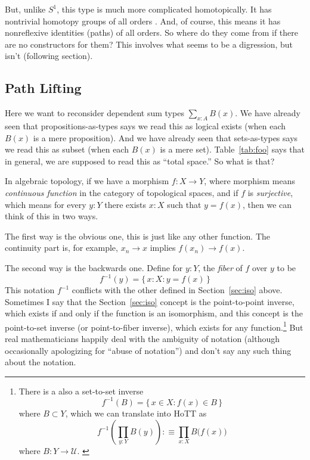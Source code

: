 \documentclass[11pt]{article}
\newcommand{\set}[1]{\{\,#1\,\}}
\newcommand{\universe}{\mathcal{U}}
\begin{document}
But, unlike $S^1$, this type is much more complicated homotopically.
It has nontrivial homotopy groups of all orders
.
And, of course, this means it has nonreflexive identities (paths) of all
orders.  So where do they come from if there are no constructors for them?
This involves what seems to be a digression, but isn't (following section).

\subsection{Path Lifting}
\label{sec:lifting}

Here we want to reconsider dependent sum types $\sum_{x : A} B(x)$.
We have already seen that propositions-as-types says we read this as
logical exists (when each $B(x)$ is a mere proposition).
And we have already seen that sets-as-types says we read this as
subset (when each $B(x)$ is a mere set).
Table~\ref{tab:foo} says that in general, we are supposed to read this
as ``total space.''  So what is that?

In algebraic topology, if we have a morphism $f : X \to Y$, where morphism
means \emph{continuous function} in the category of topological spaces,
and if $f$ is \emph{surjective}, which means for every $y : Y$ there exists
$x : X$ such that $y = f(x)$, then we can think of this in two ways.

The first way is the obvious one, this is just like any other function.
The continuity part is, for example, $x_n \to x$ implies $f(x_n) \to f(x)$.

The second way is the backwards one.  Define for $y : Y$,
the \emph{fiber} of $f$ over $y$ to be
$$
   f^{-1}(y) = \set{ x : X : y = f(x) }
$$
This notation $f^{-1}$ conflicts with the other defined
in Section~\ref{sec:iso} above.  Sometimes I say that
the Section~\ref{sec:iso} concept is the point-to-point inverse,
which exists if and only if the function is an isomorphism,
and this concept is the point-to-set inverse
(or point-to-fiber inverse), which exists for
any function.\footnote{There is a also a set-to-set inverse
$$
   f^{-1}(B) = \set{ x \in X : f(x) \in B }
$$
where $B \subset Y$, which we can translate into HoTT as
$$
   f^{-1}\left(\prod_{y : Y} B(y)\right) :\equiv
   \prod_{x : X} B\bigl(f(x)\bigr)
$$
where $B : Y \to \universe$.
\label{foot:set-to-set}
}
But real mathematicians happily deal with the ambiguity of notation
(although occasionally apologizing for ``abuse of notation'') and don't
say any such thing about the notation.
\end{document}
